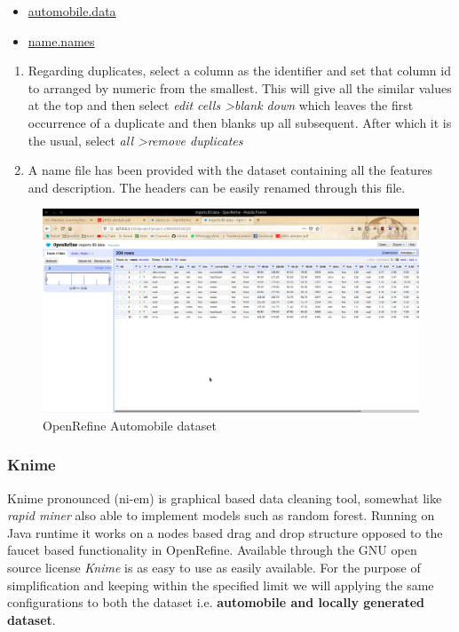 \documentclass[12pt]{article}
\begin{document}
\begin{itemize}
	\item \href{run:./automobile.data}{automobile.data}
	\item \href{run:./name.names}{name.names}
\end{itemize}

\begin{enumerate}
	\item Regarding duplicates, select a column as the identifier and set that column id to arranged by numeric from the smallest. This will give all the similar values at the top and then select \emph{edit cells \textgreater blank down} which leaves the first occurrence of a duplicate and then blanks up all subsequent. After which it is the usual, select \emph{all \textgreater remove duplicates}  
	\item A name file has been provided with the dataset containing all the features and description. The headers can be easily renamed through this file.
\end{enumerate}

\begin{figure}
  \includegraphics[width=\linewidth]{OpenRefine.png}
  \caption{OpenRefine Automobile dataset}
  \label{fig:OpenRefine}
\end{figure}

\subsubsection*{Knime}
Knime pronounced (ni-em) is graphical based data cleaning tool, somewhat like \emph{rapid miner} also able to implement models such as random forest. Running on Java runtime it works on a nodes based drag and drop structure opposed to the faucet based functionality in OpenRefine. Available through the GNU open source license \emph{Knime} is as easy to use as easily available. For the purpose of simplification and keeping within the specified limit we will applying the same configurations to both the dataset i.e. \textbf{automobile and locally generated dataset}. \\
\end{document}

